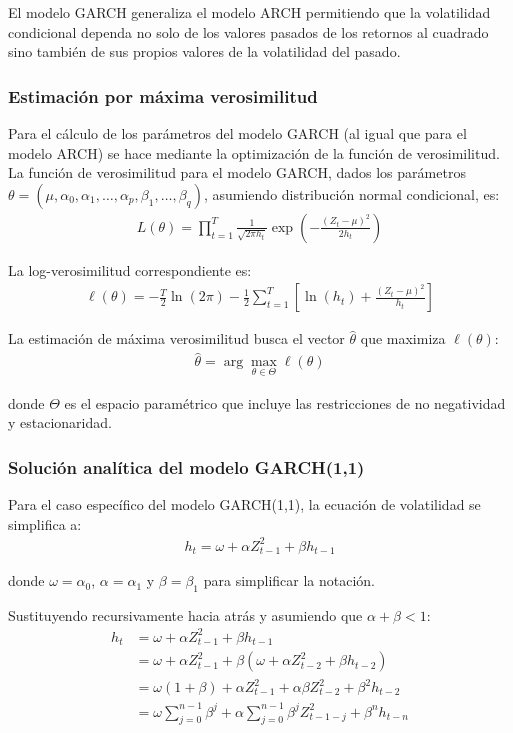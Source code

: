 El modelo GARCH generaliza el modelo ARCH permitiendo que la volatilidad condicional dependa no solo de los valores pasados de los retornos al cuadrado sino también de sus propios valores de la volatilidad del pasado. 
\subsubsection{Estimación por máxima verosimilitud}

Para el cálculo de los parámetros del modelo GARCH (al igual que para el modelo ARCH) se hace mediante la optimización de la función de verosimilitud. La función de verosimilitud para el modelo GARCH, dados los parámetros $\theta = (\mu, \alpha_0, \alpha_1, \ldots, \alpha_p, \beta_1, \ldots, \beta_q)$, asumiendo distribución normal condicional, es:
\begin{align*}
    L(\theta) = \prod_{t=1}^{T} \frac{1}{\sqrt{2\pi h_t}} \exp\left(-\frac{(Z_t - \mu)^2}{2h_t}\right)
\end{align*}

La log-verosimilitud correspondiente es:
\begin{align*}
    \ell(\theta) = -\frac{T}{2}\ln(2\pi) - \frac{1}{2}\sum_{t=1}^{T}\left[\ln(h_t) + \frac{(Z_t - \mu)^2}{h_t}\right]
\end{align*}

La estimación de máxima verosimilitud busca el vector $\hat{\theta}$ que maximiza $\ell(\theta)$:
\begin{align*}
    \hat{\theta} = \arg\max_{\theta \in \Theta} \ell(\theta)
\end{align*}

donde $\Theta$ es el espacio paramétrico que incluye las restricciones de no negatividad y estacionaridad.

\subsubsection{Solución analítica del modelo GARCH(1,1)}

Para el caso específico del modelo GARCH(1,1), la ecuación de volatilidad se simplifica a:
\begin{align}
    h_t = \omega + \alpha Z_{t-1}^2 + \beta h_{t-1}
\end{align}

donde $\omega = \alpha_0$, $\alpha = \alpha_1$ y $\beta = \beta_1$ para simplificar la notación.

Sustituyendo recursivamente hacia atrás y asumiendo que $\alpha + \beta < 1$:
\begin{align}
    h_t &= \omega + \alpha Z_{t-1}^2 + \beta h_{t-1}\\
    &= \omega + \alpha Z_{t-1}^2 + \beta(\omega + \alpha Z_{t-2}^2 + \beta h_{t-2})\\
    &= \omega(1 + \beta) + \alpha Z_{t-1}^2 + \alpha\beta Z_{t-2}^2 + \beta^2 h_{t-2}\\
    &= \omega \sum_{j=0}^{n-1} \beta^j + \alpha \sum_{j=0}^{n-1} \beta^j Z_{t-1-j}^2 + \beta^n h_{t-n}
\end{align}

